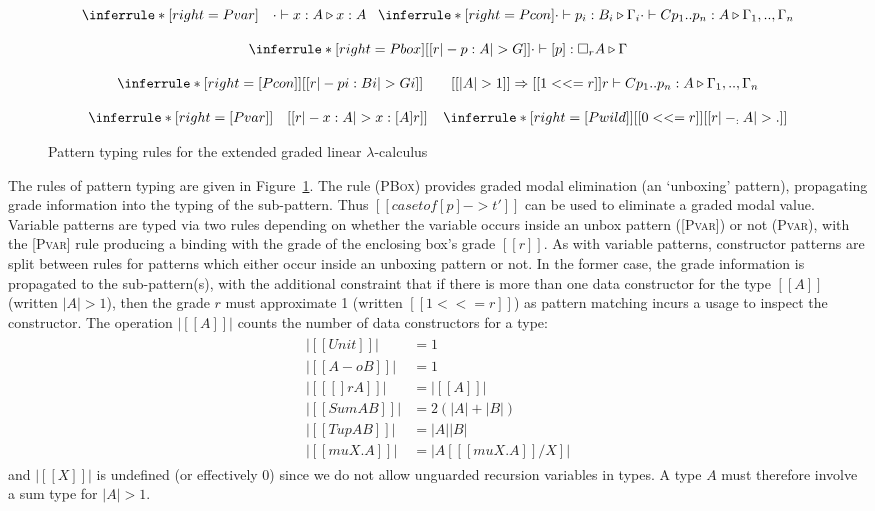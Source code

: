 \begin{figure}[t]
\begin{align*}
\setlength{\arraycolsep}{0em}
\begin{array}{ccc}
\inferrule*[right=Pvar]
 {\quad}
 {\cdot \vdash x : A \triangleright x : A}
\;\;\;
\inferrule*[right=Pcon]
{\cdot \vdash p_i : B_i \triangleright \Gamma_i}
{\cdot \vdash C p_1 .. p_n : A \triangleright \Gamma_1, .., \Gamma_n}
\\[1.25em]
\inferrule*[right={Pbox}]
{[[ r |- p : A |> G ]]}
{\cdot \vdash [p] : \Box_r A \triangleright \Gamma }
 \\[1.25em]
\inferrule*[right={[}Pcon{]}]
{[[ r |- pi : Bi |> Gi ]] \quad\quad
[[ |A| > 1 ]] \Rightarrow [[ 1 <<= r ]]}
{r \vdash C p_1 .. p_n : A \triangleright \Gamma_1, .., \Gamma_n}
%
\\[1.25em]
\inferrule*[right={[}Pvar{]}]
 {\quad}
 {[[ r |- x : A |> x : [ A ] { r } ]]}
 \;\;\;\;
\inferrule*[right={[}Pwild{]}]
 {[[ 0 <<= r ]]}
 {[[ r |- _ : A |> . ]]}
\end{array}
\end{align*}
\caption{Pattern typing rules for the extended graded linear $\lambda$-calculus}
\label{fig:deriving-pattern-rules}
\end{figure}

The rules of pattern typing are given in
Figure~\ref{fig:deriving-pattern-rules}.
The rule (\textsc{PBox}) provides
graded modal elimination (an `unboxing' pattern),
propagating grade information into the typing of the
sub-pattern. Thus $[[ case t of [p] -> t' ]]$ can be used to eliminate
a graded modal value. Variable patterns are typed via two
rules depending on whether the variable occurs inside an unbox pattern
(\textsc{[Pvar]}) or not (\textsc{Pvar}),
with the \textsc{[Pvar]} rule producing a binding with the grade of
the enclosing box’s grade $[[ r ]]$.
As with variable patterns, constructor patterns are split
between rules for patterns which either occur inside an unboxing
pattern or not. In the former case, the grade information is
propagated to the sub-pattern(s), with the additional constraint that
if there is more than one data constructor for the type $[[ A ]]$ (written
$|A| > 1$), then the grade $r$ must approximate 1 (written $[[ 1 <<= r
]]$) as pattern matching
incurs a usage to inspect the constructor. The
operation $|[[ A ]]|$ counts the number of data constructors
for a type:
%
\begin{align*}
  \begin{array}{ll}
|[[ Unit ]]| &= 1 \\
|[[ A -o B ]]| &= 1 \\
|[[ [] r A ]]| &= |[[  A ]]| \\
|[[ Sum A B ]]| &= 2 (|A| + |B|) \\
|[[ Tup A B ]]| &= |A| |B| \\
|[[ mu X . A ]]| &= |A [ [[ mu X . A ]] / X ]|
  \end{array}
\end{align*}
%
and $|[[ X ]]|$ is undefined (or effectively 0) since we do not
allow unguarded recursion variables in types.
A type $A$ must therefore involve a sum type for $|A| > 1$.

